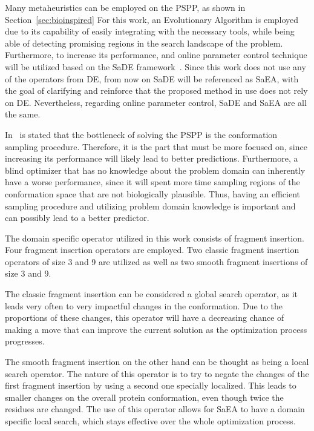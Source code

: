Many metaheuristics can be employed
on the \ac{PSPP}, as shown in Section~\ref{sec:bioinspired}
For this work, an Evolutionary Algorithm is employed due to its capability
of easily integrating with the necessary tools,
while being able of detecting promising regions in the search landscape of the
problem. Furthermore, to increase
its performance, and online parameter control technique will be
utilized based on the \ac{SaDE} framework~\cite{qin2005self,qin2009differential}.
Since this work does not use any of the operators from \ac{DE}, from now on
\ac{SaDE} will be referenced as \ac{SaEA}, with the goal of clarifying
and reinforce that the proposed method in use does not rely on \ac{DE}.
Nevertheless, regarding online parameter control, \ac{SaDE} and \ac{SaEA}
are all the same.

In~\cite{kim2009sampling} is stated that the bottleneck of solving the
\ac{PSPP} is the conformation sampling procedure. Therefore, it is the part
that must be more focused on, since increasing its performance will likely lead
to better predictions. Furthermore, a blind optimizer that has no knowledge
about the problem domain can inherently have a worse performance, since it will
spent more time sampling regions of the conformation space that are not
biologically plausible. Thus, having an efficient sampling procedure and
utilizing problem domain knowledge is important and can possibly lead to a
better predictor.

The domain specific operator utilized in this work consists of
fragment insertion. Four fragment insertion operators are employed.
Two classic fragment insertion operators of size 3 and 9 are utilized
as well as two smooth fragment insertions of size 3 and 9.

The classic fragment insertion can be considered a global search
operator, as it leads very often to very impactful changes
in the conformation. Due to the proportions of these changes,
this operator will have a decreasing chance of making a move
that can improve the current solution as the optimization process
progresses.

The smooth fragment insertion on the other hand can be thought as
being a local search operator. The nature of this operator
is to try to negate the changes of the first fragment insertion by using
a second one specially localized. This leads to smaller changes on the
overall protein conformation, even though twice the residues are changed.
The use of this operator allows for \ac{SaEA} to have a domain specific local
search, which stays effective over the whole optimization process.

